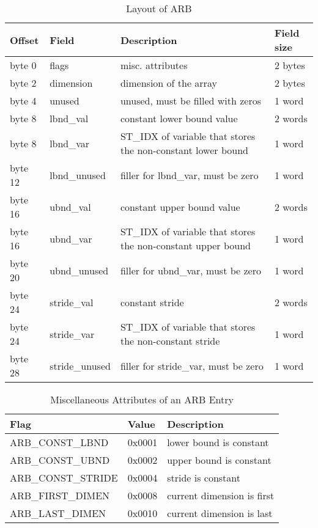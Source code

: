 \begin{table}[h]
\centering
\caption{Layout of ARB} 
\label{table24} 
\begin{tabular}{|l|l|l|l|}\hline
Offset & Field & Description & Field size \\\hline\hline
byte 0 & flags & misc. attributes & 2 bytes\\\hline 
byte 2 & dimension & dimension of the array & 2 bytes\\\hline 
byte 4 & unused & unused, must be filled with zeros & 1 word \\\hline
byte 8 & lbnd\_val & constant lower bound value & 2 words \\\hline
byte 8 & lbnd\_var &
\index{ST\_IDX}%
ST\_IDX of variable that stores the non-constant lower bound & 1 word \\\hline
byte 12&  lbnd\_unused & filler for lbnd\_var, must be zero & 1 word \\\hline
byte 16 & ubnd\_val & constant upper bound value & 2 words \\\hline
byte 16 & ubnd\_var &
\index{ST\_IDX}%
ST\_IDX of variable that stores the non-constant upper bound & 1 word\\\hline
byte 20 & ubnd\_unused & filler for ubnd\_var, must be zero & 1 word \\\hline
byte 24 & stride\_val & constant stride & 2 words \\\hline
byte 24 & stride\_var &
\index{ST\_IDX}%
ST\_IDX of variable that stores the non-constant stride & 1 word\\\hline
byte 28 & stride\_unused & filler for stride\_var, must be zero & 1 word\\\hline
\end{tabular}
\end{table}

\begin{table}[h]
\centering
\caption{Miscellaneous Attributes of an
%
ARB Entry}
\label{table25}
\begin{tabular}{|l|l|l|}\hline
Flag  & Value & Description\\\hline\hline
\index{ARB\_CONST\_LBND}%
ARB\_CONST\_LBND & 0x0001 &lower bound is constant\\\hline
\index{ARB\_CONST\_UBND}%
ARB\_CONST\_UBND & 0x0002 &upper bound is constant\\\hline 
\index{ARB\_CONST\_STRIDE}%
ARB\_CONST\_STRIDE & 0x0004 &stride is constant \\\hline
\index{ARB\_FIRST\_DIMEN}%
ARB\_FIRST\_DIMEN & 0x0008 &current dimension is first \\\hline
\index{ARB\_LAST\_DIMEN}%
ARB\_LAST\_DIMEN & 0x0010 &current dimension is last\\\hline
\end{tabular}
\end{table}

